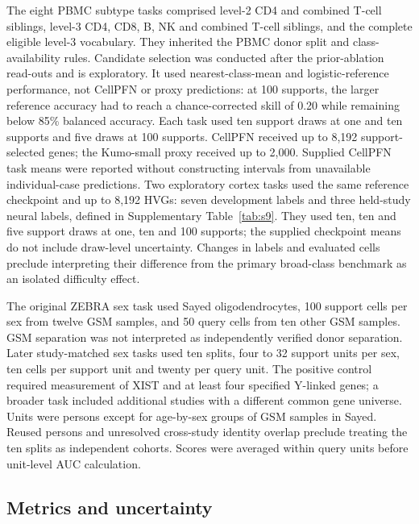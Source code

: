 The eight PBMC subtype tasks comprised level-2 CD4 and combined T-cell siblings, level-3 CD4, CD8, B, NK and combined T-cell siblings, and the complete eligible level-3 vocabulary. They inherited the PBMC donor split and class-availability rules. Candidate selection was conducted after the prior-ablation read-outs and is exploratory. It used nearest-class-mean and logistic-reference performance, not CellPFN or proxy predictions: at 100 supports, the larger reference accuracy had to reach a chance-corrected skill of 0.20 while remaining below 85\% balanced accuracy. Each task used ten support draws at one and ten supports and five draws at 100 supports. CellPFN received up to 8,192 support-selected genes; the Kumo-small proxy received up to 2,000. Supplied CellPFN task means were reported without constructing intervals from unavailable individual-case predictions. Two exploratory cortex tasks used the same reference checkpoint and up to 8,192 HVGs: seven development labels and three held-study neural labels, defined in Supplementary Table~\ref{tab:s9}. They used ten, ten and five support draws at one, ten and 100 supports; the supplied checkpoint means do not include draw-level uncertainty. Changes in labels and evaluated cells preclude interpreting their difference from the primary broad-class benchmark as an isolated difficulty effect.

The original ZEBRA sex task used Sayed oligodendrocytes, 100 support cells per sex from twelve GSM samples, and 50 query cells from ten other GSM samples. GSM separation was not interpreted as independently verified donor separation. Later study-matched sex tasks used ten splits, four to 32 support units per sex, ten cells per support unit and twenty per query unit. The positive control required measurement of XIST and at least four specified Y-linked genes; a broader task included additional studies with a different common gene universe. Units were persons except for age-by-sex groups of GSM samples in Sayed. Reused persons and unresolved cross-study identity overlap preclude treating the ten splits as independent cohorts. Scores were averaged within query units before unit-level AUC calculation. 

\subsection*{Metrics and uncertainty}

